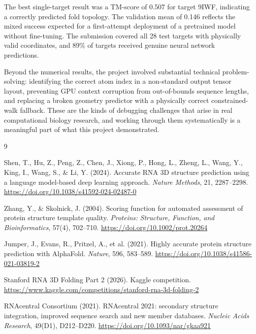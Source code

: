 \documentclass[11pt,a4paper]{article}
\begin{document}
The best single-target result was a TM-score of 0.507 for target 9IWF, indicating a correctly predicted fold topology. The validation mean of 0.146 reflects the mixed success expected for a first-attempt deployment of a pretrained model without fine-tuning. The submission covered all 28 test targets with physically valid coordinates, and 89\% of targets received genuine neural network predictions.

Beyond the numerical results, the project involved substantial technical problem-solving: identifying the correct atom index in a non-standard output tensor layout, preventing GPU context corruption from out-of-bounds sequence lengths, and replacing a broken geometry predictor with a physically correct constrained-walk fallback. These are the kinds of debugging challenges that arise in real computational biology research, and working through them systematically is a meaningful part of what this project demonstrated.


\begin{thebibliography}{9}

Shen, T., Hu, Z., Peng, Z., Chen, J., Xiong, P., Hong, L., Zheng, L., Wang, Y.,
King, I., Wang, S., \& Li, Y. (2024).
Accurate RNA 3D structure prediction using a language model-based deep learning approach.
\textit{Nature Methods}, 21, 2287--2298.
\url{https://doi.org/10.1038/s41592-024-02487-0}

Zhang, Y., \& Skolnick, J. (2004).
Scoring function for automated assessment of protein structure template quality.
\textit{Proteins: Structure, Function, and Bioinformatics}, 57(4), 702--710.
\url{https://doi.org/10.1002/prot.20264}

Jumper, J., Evans, R., Pritzel, A., et al. (2021).
Highly accurate protein structure prediction with AlphaFold.
\textit{Nature}, 596, 583--589.
\url{https://doi.org/10.1038/s41586-021-03819-2}

Stanford RNA 3D Folding Part 2 (2026).
Kaggle competition.
\url{https://www.kaggle.com/competitions/stanford-rna-3d-folding-2}

RNAcentral Consortium (2021).
RNAcentral 2021: secondary structure integration, improved sequence search and new member databases.
\textit{Nucleic Acids Research}, 49(D1), D212--D220.
\url{https://doi.org/10.1093/nar/gkaa921}

\end{thebibliography}
\end{document}
